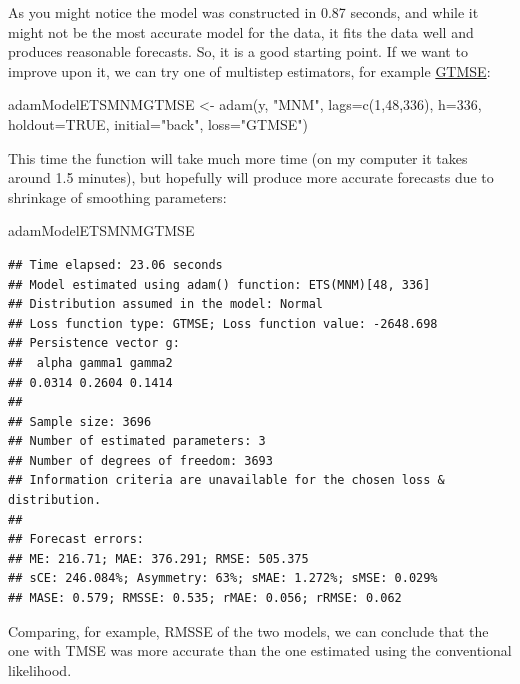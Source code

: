 \documentclass[
]{book}
\newenvironment{Shaded}{\begin{snugshade}}{\end{snugshade}}
\newcommand{\AttributeTok}[1]{\textcolor[rgb]{0.77,0.63,0.00}{#1}}
\newcommand{\ConstantTok}[1]{\textcolor[rgb]{0.00,0.00,0.00}{#1}}
\newcommand{\DecValTok}[1]{\textcolor[rgb]{0.00,0.00,0.81}{#1}}
\newcommand{\FunctionTok}[1]{\textcolor[rgb]{0.00,0.00,0.00}{#1}}
\newcommand{\NormalTok}[1]{#1}
\newcommand{\OtherTok}[1]{\textcolor[rgb]{0.56,0.35,0.01}{#1}}
\newcommand{\StringTok}[1]{\textcolor[rgb]{0.31,0.60,0.02}{#1}}
\theoremstyle{definition}
\theoremstyle{definition}
\theoremstyle{definition}
\theoremstyle{definition}
\theoremstyle{remark}
\begin{document}
As you might notice the model was constructed in 0.87 seconds, and while it might not be the most accurate model for the data, it fits the data well and produces reasonable forecasts. So, it is a good starting point. If we want to improve upon it, we can try one of multistep estimators, for example \protect\hyperlink{multistepLossesGTMSE}{GTMSE}:

\begin{Shaded}
\begin{Highlighting}[]
\NormalTok{adamModelETSMNMGTMSE }\OtherTok{\textless{}{-}} \FunctionTok{adam}\NormalTok{(y, }\StringTok{"MNM"}\NormalTok{, }\AttributeTok{lags=}\FunctionTok{c}\NormalTok{(}\DecValTok{1}\NormalTok{,}\DecValTok{48}\NormalTok{,}\DecValTok{336}\NormalTok{),}
                             \AttributeTok{h=}\DecValTok{336}\NormalTok{, }\AttributeTok{holdout=}\ConstantTok{TRUE}\NormalTok{,}
                             \AttributeTok{initial=}\StringTok{"back"}\NormalTok{, }\AttributeTok{loss=}\StringTok{"GTMSE"}\NormalTok{)}
\end{Highlighting}
\end{Shaded}

This time the function will take much more time (on my computer it takes around 1.5 minutes), but hopefully will produce more accurate forecasts due to shrinkage of smoothing parameters:

\begin{Shaded}
\begin{Highlighting}[]
\NormalTok{adamModelETSMNMGTMSE}
\end{Highlighting}
\end{Shaded}

\begin{verbatim}
## Time elapsed: 23.06 seconds
## Model estimated using adam() function: ETS(MNM)[48, 336]
## Distribution assumed in the model: Normal
## Loss function type: GTMSE; Loss function value: -2648.698
## Persistence vector g:
##  alpha gamma1 gamma2 
## 0.0314 0.2604 0.1414 
## 
## Sample size: 3696
## Number of estimated parameters: 3
## Number of degrees of freedom: 3693
## Information criteria are unavailable for the chosen loss & distribution.
## 
## Forecast errors:
## ME: 216.71; MAE: 376.291; RMSE: 505.375
## sCE: 246.084%; Asymmetry: 63%; sMAE: 1.272%; sMSE: 0.029%
## MASE: 0.579; RMSSE: 0.535; rMAE: 0.056; rRMSE: 0.062
\end{verbatim}

Comparing, for example, RMSSE of the two models, we can conclude that the one with TMSE was more accurate than the one estimated using the conventional likelihood.
\end{document}
